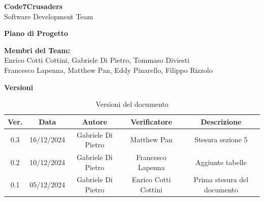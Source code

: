\documentclass{article}
\begin{document}
\begin{titlepage}
    {\Huge \textbf{Code7Crusaders}}\\
    \vspace{0.5cm}
    {\Large Software Development Team}\\
    \vspace{2cm}
    
    {\large \textbf{Piano di Progetto}}\\
    \vspace{5cm}
    
    
    \textbf{Membri del Team:}\\
    Enrico Cotti Cottini, Gabriele Di Pietro, Tommaso Diviesti \\
    Francesco Lapenna, Matthew Pan, Eddy Pinarello, Filippo Rizzolo \\
    \vspace{0.5cm}
    
    \vspace{1cm}
\end{titlepage}



\begin{table}[h!]
\centering
\textbf{Versioni} \\ %
\vspace{2mm} %
\begin{tabular}{|c|c|c|c|c|}
    \hline
    \textbf{Ver.} & \textbf{Data} & \textbf{Autore} & \textbf{Verificatore} & \textbf{Descrizione} \\
    \hline
    0.3 & 16/12/2024 & Gabriele Di Pietro & Matthew Pan & Stesura sezione 5 \\
    0.2 & 10/12/2024 & Gabriele Di Pietro & Francesco Lapenna & Aggiunte tabelle \\
    0.1 & 05/12/2024 & Gabriele Di Pietro & Enrico Cotti Cottini & Prima stesura del documento \\  
    \hline
\end{tabular}
\caption{Versioni del documento}
\label{tab:versioni}
\end{table}



\tableofcontents
\listoftables
\listoffigures
\end{document}
